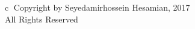 \begin{center}

\vspace*{\fill}

\textcircled{c} Copyright by Seyedamirhossein Hesamian, 2017\\
All Rights Reserved
\vspace*{\fill}

\end{center}


\newpage